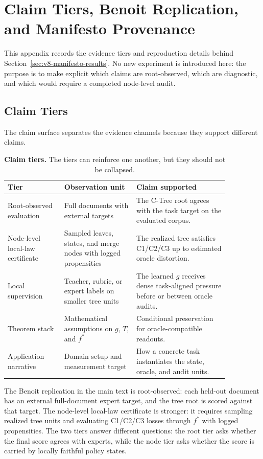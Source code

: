 \section{Claim Tiers, Benoit Replication, and Manifesto Provenance}
\label{app:v8-claim-tiers-manifesto}
\label{app:v8-benoit-replication}

This appendix records the evidence tiers and reproduction details behind
Section~\ref{sec:v8-manifesto-results}. No new experiment is introduced here:
the purpose is to make explicit which claims are root-observed, which are
diagnostic, and which would require a completed node-level audit.

\subsection{Claim Tiers}

The claim surface separates the evidence channels because they support
different claims.

\begin{table}[t]
\centering
\small
\begin{tabular}{@{}p{0.22\linewidth}p{0.28\linewidth}p{0.36\linewidth}@{}}
\toprule
Tier & Observation unit & Claim supported \\
\midrule
Root-observed evaluation & Full documents with external targets &
The C-Tree root agrees with the task target on the evaluated corpus. \\
Node-level local-law certificate & Sampled leaves, states, and merge nodes
with logged propensities &
The realized tree satisfies C1/C2/C3 up to estimated oracle distortion. \\
Local supervision & Teacher, rubric, or expert labels on smaller tree units &
The learned \(g\) receives dense task-aligned pressure before or between
oracle audits. \\
Theorem stack & Mathematical assumptions on \(g\), \(T\), and \(f^\ast\) &
Conditional preservation for oracle-compatible readouts. \\
Application narrative & Domain setup and measurement target &
How a concrete task instantiates the state, oracle, and audit units. \\
\bottomrule
\end{tabular}
\caption{\textbf{Claim tiers.} The tiers can reinforce one another,
but they should not be collapsed.}
\label{tab:v8-claim-tiers}
\end{table}

The Benoit replication in the main text is root-observed: each held-out
document has an external full-document expert target, and the tree root is
scored against that target. The node-level local-law certificate is stronger:
it requires sampling realized tree units and evaluating C1/C2/C3 losses through
\(f^\ast\) with logged propensities. The two tiers answer different questions:
the root tier asks whether the final score agrees with experts, while the node
tier asks whether the score is carried by locally faithful policy states.

